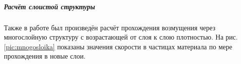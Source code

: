 \subparagraph{Расчёт слоистой структуры}
Также в работе был произведён расчёт прохождения возмущения через многослойную структуру с возрастающей от слоя к слою плотностью. На рис.\ref{pic:mnogosloika} показаны значения скорости в частицах материала по мере прохождения в новые слои.

\begin{figure}
\begin{minipage}[h]{0.47\linewidth}
  \\
\end{minipage}
\hfill
\begin{minipage}[h]{0.47\linewidth}
 \\

\end{minipage}
\end{figure}
